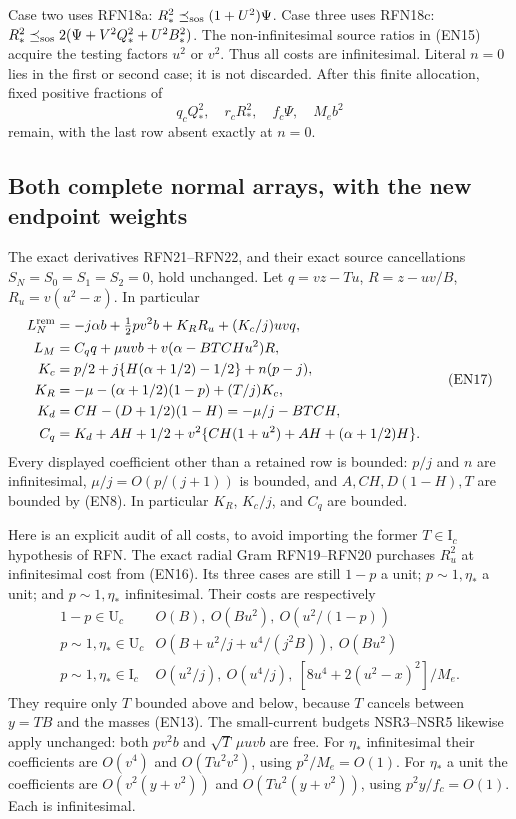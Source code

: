 Case two uses RFN18a:
$R_*^2\preceq_{\rm sos}(1+U^2)\Psi$.
Case three uses RFN18c:
$R_*^2\preceq_{\rm sos}2(\Psi+V^2Q_*^2+U^2B_*^2)$.
The non-infinitesimal source ratios in (EN15) acquire the testing
factors $u^2$ or $v^2$. Thus all costs are infinitesimal.
Literal $n=0$ lies in the first or second case; it is not discarded.
After this finite allocation, fixed positive fractions of
\[
q_cQ_*^2,\quad r_cR_*^2,\quad f_c\Psi,\quad M_eb^2       \tag{EN16}
\]
remain, with the last row absent exactly at $n=0$.

\subsection{Both complete normal arrays, with the new endpoint weights}

The exact derivatives RFN21--RFN22, and their exact source cancellations
$S_N=S_0=S_1=S_2=0$, hold unchanged. Let
$q=vz-Tu$, $R=z-uv/B$, $R_u=v(u^2-x)$. In particular
\[
\begin{aligned}
L_N^{\rm rem}
&=-j\alpha b+\tfrac12pv^2b+K_RR_u+(K_c/j)uvq,\\
L_M&=C_qq+\mu uvb+v(\alpha-BTCHu^2)R,\\
K_c&=p/2+j\{H(\alpha+1/2)-1/2\}+n(p-j),\\
K_R&=-\mu-(\alpha+1/2)(1-p)+(T/j)K_c,\\
K_d&=CH-(D+1/2)(1-H)=-\mu/j-BTCH,\\
C_q&=K_d+AH+1/2+
v^2\{CH(1+u^2)+AH+(\alpha+1/2)H\}.
\end{aligned}                                                    \tag{EN17}
\]
Every displayed coefficient other than a retained row is bounded:
$p/j$ and $n$ are infinitesimal, $\mu/j=O(p/(j+1))$ is bounded,
and $A,CH,D(1-H),T$ are bounded by (EN8).
In particular $K_R$, $K_c/j$, and $C_q$ are bounded.

Here is an explicit audit of all costs, to avoid importing the former
$T\in\mathrm I_c$ hypothesis of RFN.
The exact radial Gram RFN19--RFN20 purchases $R_u^2$ at infinitesimal
cost from (EN16). Its three cases are still $1-p$ a unit;
$p\sim1,\eta_*$ a unit; and $p\sim1,\eta_*$ infinitesimal.
Their costs are respectively
\[
\begin{array}{c|l}
1-p\in\mathrm U_c&O(B),\ O(Bu^2),\ O(u^2/(1-p))\\
p\sim1,\eta_*\in\mathrm U_c&
 O(B+u^2/j+u^4/(j^2B)),\ O(Bu^2)\\
p\sim1,\eta_*\in\mathrm I_c&
 O(u^2/j),\ O(u^4/j),\
 [8u^4+2(u^2-x)^2]/M_e .
\end{array}                                                    \tag{EN18}
\]
They require only $T$ bounded above and below, because $T$ cancels
between $y=TB$ and the masses (EN13).
The small-current budgets NSR3--NSR5 likewise apply unchanged:
both $pv^2b$ and $\sqrt T\,\mu uvb$ are free.
For $\eta_*$ infinitesimal their coefficients are
$O(v^4)$ and $O(Tu^2v^2)$, using $p^2/M_e=O(1)$.
For $\eta_*$ a unit the coefficients are
$O(v^2(y+v^2))$ and $O(Tu^2(y+v^2))$, using
$p^2y/f_c=O(1)$. Each is infinitesimal.

